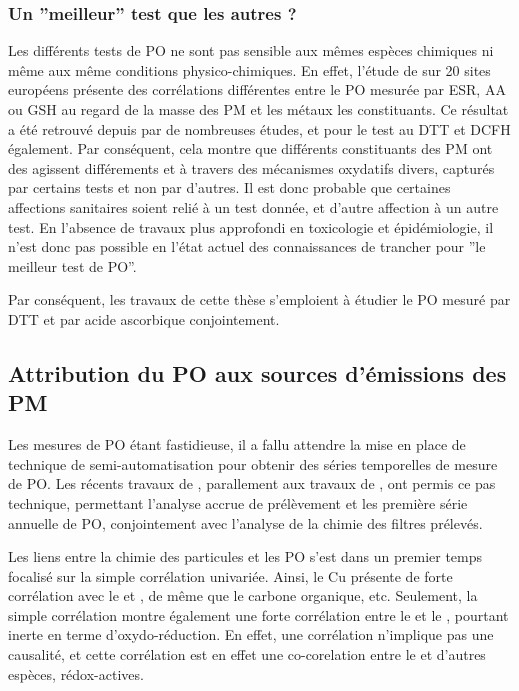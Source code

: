 \subsubsection{Un ''meilleur'' test que les autres ?}%
\label{ssub:un_meilleur_test_que_les_autres_}

Les différents tests de PO ne sont pas sensible aux mêmes espèces chimiques ni même aux même
conditions physico-chimiques. En effet, l'étude de \textcite{kunzliComparison2006} sur 20
sites européens présente des corrélations différentes entre le PO mesurée par ESR, AA ou
GSH au regard de la masse des PM et les métaux les constituants.
Ce résultat a été retrouvé depuis par de nombreuses études, et pour le test au DTT et DCFH
également. Par conséquent, cela montre que différents constituants des PM ont des agissent
différements et à travers des mécanismes oxydatifs divers, capturés par certains tests et
non par d'autres.
Il est donc probable que certaines affections sanitaires soient relié à un test donnée, et
d'autre affection à un autre test. En l'absence de travaux plus approfondi en toxicologie
et épidémiologie, il n'est donc pas possible en l'état actuel des connaissances de trancher
pour ''le meilleur test de PO''.

Par conséquent, les travaux de cette thèse s'emploient à étudier le PO mesuré par DTT et
par acide ascorbique conjointement.

\subsection{Attribution du PO aux sources d'émissions des PM}%
\label{sub:attribution_du_po_aux_sources_d_émissions_des_pm}

Les mesures de PO étant fastidieuse, il a fallu attendre la mise en place de technique
de semi-automatisation pour obtenir des séries temporelles de mesure de PO. Les récents
travaux de \textcite{fangSemiautomated2015}, parallement aux travaux de
\textcite{calasPollution2017}, ont permis ce pas technique, permettant l'analyse accrue de
prélèvement et les première série annuelle de PO, conjointement avec l'analyse de la
chimie des filtres prélevés.

Les liens entre la chimie des particules et les PO s'est dans un premier temps focalisé
sur la simple corrélation univariée. Ainsi, le Cu présente de forte corrélation
avec le \PODTT{} et \POAA, de même que le carbone organique, etc. Seulement, la simple
corrélation montre également une forte corrélation entre le \PODTT{} et le ,
pourtant inerte en terme d'oxydo-réduction.
En effet, une corrélation n'implique pas une causalité, et cette corrélation est en effet
une co-corelation entre le  et d'autres espèces, rédox-actives.

